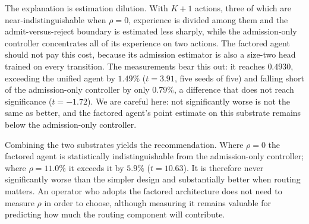 \documentclass[10pt,journal,comsoc]{IEEEtran}
\begin{document}
The explanation is estimation dilution. With $K+1$ actions, three of which
are near-indistinguishable when $\rho=0$, experience is divided among
them and the admit-versus-reject boundary is estimated less sharply, while
the admission-only controller concentrates all of its experience on two
actions. The factored agent should not pay this cost, because its
admission estimator is also a size-two head trained on every transition.
The measurements bear this out: it reaches $0.4930$, exceeding the unified
agent by $1.49\%$ ($t=3.91$, five seeds of five) and falling short of the
admission-only controller by only $0.79\%$, a difference that does not
reach significance ($t=-1.72$). We are careful here: not significantly
worse is not the same as better, and the factored agent's point estimate
on this substrate remains below the admission-only controller.

Combining the two substrates yields the recommendation. Where $\rho=0$ the
factored agent is statistically indistinguishable from the admission-only
controller; where $\rho=11.0\%$ it exceeds it by $5.9\%$ ($t=10.63$). It is
therefore never significantly worse than the simpler design and
substantially better when routing matters. An operator who adopts the
factored architecture does not need to measure $\rho$ in order to choose,
although measuring it remains valuable for predicting how much the routing
component will contribute.
\end{document}
